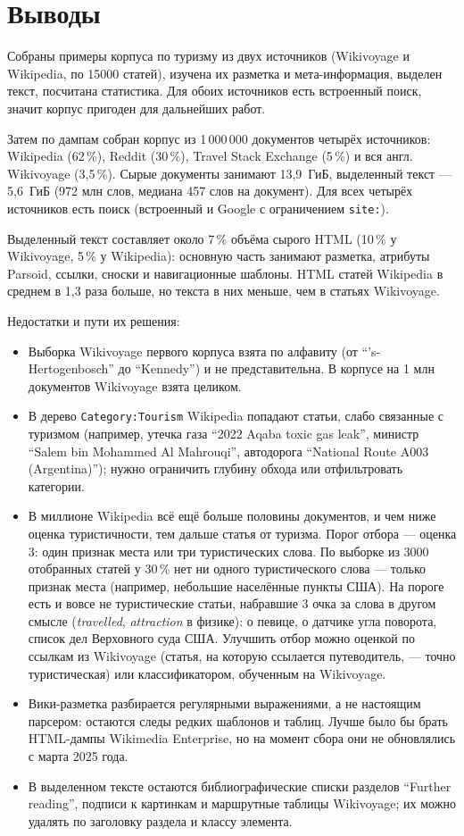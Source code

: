 \section{Выводы}
Собраны примеры корпуса по туризму из двух источников (Wikivoyage и Wikipedia, по 15000 статей), изучена их разметка и мета-информация, выделен текст, посчитана статистика. Для обоих источников есть встроенный поиск, значит корпус пригоден для дальнейших работ.

Затем по дампам собран корпус из 1\,000\,000 документов четырёх источников: Wikipedia (62\,\%), Reddit (30\,\%), Travel Stack Exchange (5\,\%) и вся англ. Wikivoyage (3,5\,\%). Сырые документы занимают 13,9~ГиБ, выделенный текст --- 5,6~ГиБ (972 млн слов, медиана 457 слов на документ). Для всех четырёх источников есть поиск (встроенный и Google с ограничением \texttt{site:}).

Выделенный текст составляет около 7\,\% объёма сырого HTML (10\,\% у Wikivoyage, 5\,\% у Wikipedia): основную часть занимают разметка, атрибуты Parsoid, ссылки, сноски и навигационные шаблоны. HTML статей Wikipedia в среднем в 1,3 раза больше, но текста в них меньше, чем в статьях Wikivoyage.

Недостатки и пути их решения:
\begin{itemize}
    \item Выборка Wikivoyage первого корпуса взята по алфавиту (от \enquote{'s-Hertogenbosch} до \enquote{Kennedy}) и не представительна. В корпусе на 1 млн документов Wikivoyage взята целиком.
    \item В дерево \texttt{Category:Tourism} Wikipedia попадают статьи, слабо связанные с туризмом (например, утечка газа \enquote{2022 Aqaba toxic gas leak}, министр \enquote{Salem bin Mohammed Al Mahrouqi}, автодорога \enquote{National Route A003 (Argentina)}); нужно ограничить глубину обхода или отфильтровать категории.
    \item В миллионе Wikipedia всё ещё больше половины документов, и чем ниже оценка туристичности, тем дальше статья от туризма. Порог отбора --- оценка 3: один признак места или три туристических слова. По выборке из 3000 отобранных статей у 30\,\% нет ни одного туристического слова --- только признак места (например, небольшие населённые пункты США). На пороге есть и вовсе не туристические статьи, набравшие 3 очка за слова в другом смысле (\emph{travelled}, \emph{attraction} в физике): о певице, о датчике угла поворота, список дел Верховного суда США. Улучшить отбор можно оценкой по ссылкам из Wikivoyage (статья, на которую ссылается путеводитель, --- точно туристическая) или классификатором, обученным на Wikivoyage.
    \item Вики-разметка разбирается регулярными выражениями, а не настоящим парсером: остаются следы редких шаблонов и таблиц. Лучше было бы брать HTML-дампы Wikimedia Enterprise, но на момент сбора они не обновлялись с марта 2025 года.
    \item В выделенном тексте остаются библиографические списки разделов \enquote{Further reading}, подписи к картинкам и маршрутные таблицы Wikivoyage; их можно удалять по заголовку раздела и классу элемента.
\end{itemize}
\pagebreak
